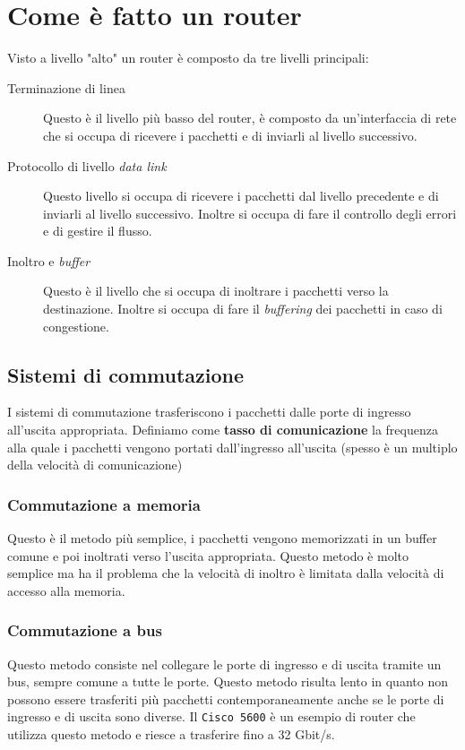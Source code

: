 \section{Come è fatto un router}
    Visto a livello "alto" un router è composto da tre livelli principali: \begin{description}
        \item[Terminazione di linea] Questo è il livello più basso del router, è composto da un'interfaccia di rete che si occupa di ricevere i pacchetti e di inviarli al livello successivo.
        \item[Protocollo di livello \textit{data link}] Questo livello si occupa di ricevere i pacchetti dal livello precedente e di inviarli al livello successivo. Inoltre si occupa di fare il controllo degli errori e di gestire il flusso.
        \item[Inoltro e \textit{buffer}] Questo è il livello che si occupa di inoltrare i pacchetti verso la destinazione. Inoltre si occupa di fare il \textit{buffering} dei pacchetti in caso di congestione.
    \end{description}
    \subsection{Sistemi di commutazione}
        I sistemi di commutazione trasferiscono i pacchetti dalle porte di ingresso all'uscita appropriata. Definiamo come \textbf{tasso di comunicazione} la frequenza alla quale i pacchetti vengono portati dall'ingresso all'uscita (spesso è un multiplo della velocità di comunicazione) 
        \subsubsection{Commutazione a memoria}
            Questo è il metodo più semplice, i pacchetti vengono memorizzati in un buffer comune e poi inoltrati verso l'uscita appropriata. Questo metodo è molto semplice ma ha il problema che la velocità di inoltro è limitata dalla velocità di accesso alla memoria.
        \subsubsection{Commutazione a bus}
            Questo metodo consiste nel collegare le porte di ingresso e di uscita tramite un bus, sempre comune a tutte le porte. Questo metodo risulta lento in quanto non possono essere trasferiti più pacchetti contemporaneamente anche se le porte di ingresso e di uscita sono diverse. Il \texttt{Cisco 5600} è un esempio di router che utilizza questo metodo e riesce a trasferire fino a 32 Gbit/s.
